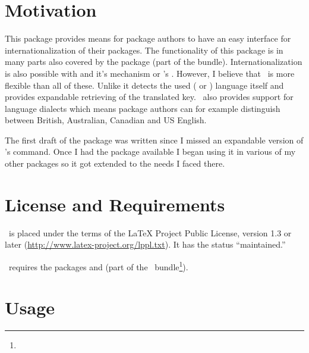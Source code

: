 \documentclass[DIV11,toc=index,toc=bib,numbers=noendperiod]{cnpkgdoc}
\begin{document}
\section{Motivation}
This package provides means for package authors to have an easy interface for
internationalization of their packages.  The functionality of this package is
in many parts also covered by the package  (part of the
 bundle).  Internationalization is also possible with
 and it's  mechanism or
\KOMAScript's .  However, I believe that
\translations\ is more flexible than all of these.  Unlike 
it detects the used ( or ) language itself and
provides expandable retrieving of the translated key.  \translations\ also
provides support for language dialects which means package authors can for
example distinguish between British, Australian, Canadian and US English.

The first draft of the package was written since I missed an expandable
version of 's  command.  Once I had the
package available I began using it in various of my other packages so it got
extended to the needs I faced there.

\section{License and Requirements}\label{sec:license}
\translations\ is placed under the terms of the \LaTeX{} Project Public
License, version 1.3 or later (\url{http://www.latex-project.org/lppl.txt}).
It has the  status ``maintained.''

\translations\ requires the packages  and 
(part of the \KOMAScript\ bundle\footnote{}).

\section{Usage}
\end{document}
